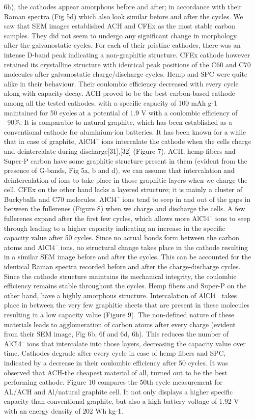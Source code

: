 \documentclass{article}
\begin{document}
6h), the cathodes appear amorphous before and after; in accordance with their Raman spectra (Fig 5d) which also look similar before and after the cycles. We saw that SEM images established ACH and CFEx as the most stable carbon samples. They did not seem to undergo any significant change in morphology after the galvanostatic cycles. For each of their pristine cathodes, there was an intense D-band peak indicating a non-graphitic structure. CFEx cathode however retained its crystalline structure with identical peak positions of the C60 and C70 molecules after galvanostatic charge/discharge cycles. Hemp and SPC were quite alike in their behaviour. Their coulombic efficiency decreased with every cycle along with capacity decay. ACH proved to be the best carbon-based cathode among all the tested cathodes, with a specific capacity of 100 mAh g-1 maintained for 50 cycles at a potential of 1.9 V with a coulombic efficiency of ~90\%. It is comparable to natural graphite, which has been established as a conventional cathode for aluminium-ion batteries. It has been known for a while that in case of graphite, AlCl4¯ ions intercalate the cathode when the cells charge and deintercalate during discharge[31],[32] (Figure 7). ACH, hemp fibers and Super-P carbon have some graphitic structure present in them (evident from the presence of G-bands, Fig 5a, b and d), we can assume that intercalation and deintercalation of ions to take place in those graphitic layers when we charge the cell. CFEx on the other hand lacks a layered structure; it is mainly a cluster of Buckyballs and C70 molecules. AlCl4¯ ions tend to seep in and out of the gaps in between the fullerenes (Figure 8) when we charge and discharge the cells. A few fullerenes expand after the first few cycles, which allows more AlCl4¯ ions to seep through leading to a higher capacity indicating an increase in the specific capacity value after 50 cycles. 
Since no actual bonds form between the carbon atoms and AlCl4¯ ions, no structural change takes place in the cathode resulting in a similar SEM image before and after the cycles. This can be accounted for the identical Raman spectra recorded before and after the charge-discharge cycles.  Since the cathode structure maintains its mechanical integrity, the coulombic efficiency remains stable throughout the cycles. Hemp fibers and Super-P on the other hand, have a highly amorphous structure. Intercalation of AlCl4¯ takes place in between the very few graphitic sheets that are present in these molecules resulting in a low capacity value (Figure 9). The non-defined nature of these materials leads to agglomeration of carbon atoms after every charge (evident from their SEM image, Fig 6b, 6f and 6d, 6h). This reduces the number of AlCl4¯ ions that intercalate into those layers, decreasing the capacity value over time. Cathodes degrade after every cycle in case of hemp fibers and SPC, indicated by a decrease in their coulombic efficiency after 50 cycles.  It was observed that ACH-the cheapest material of all, turned out to be the best performing cathode. Figure 10 compares the 50th cycle measurement for AL/ACH and Al/natural graphite cell. It not only displays a higher specific capacity than conventional graphite, but also a high battery voltage of 1.92 V with an energy density of 202 Wh kg-1. 
\end{document}
